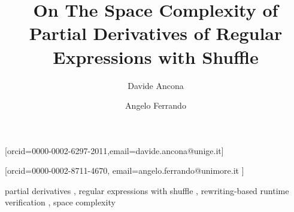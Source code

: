 \documentclass{ceurart}
\begin{document}

%
\title{On The Space Complexity of Partial Derivatives of Regular Expressions with Shuffle}

\author[1]{Davide Ancona}[orcid=0000-0002-6297-2011,email=davide.ancona@unige.it]

\cormark[1]

\address[1]{University of Genova, Italy}

\author[2]{Angelo Ferrando}[orcid=0000-0002-8711-4670,
 email=angelo.ferrando@unimore.it
]

\address[2]{University of Modena and Reggio Emilia, Italy}



\begin{keywords}
 partial derivatives \sep
 regular expressions with shuffle \sep
 rewriting-based runtime verification \sep
 space complexity
\end{keywords}

\maketitle
%

%
%





\end{document}
